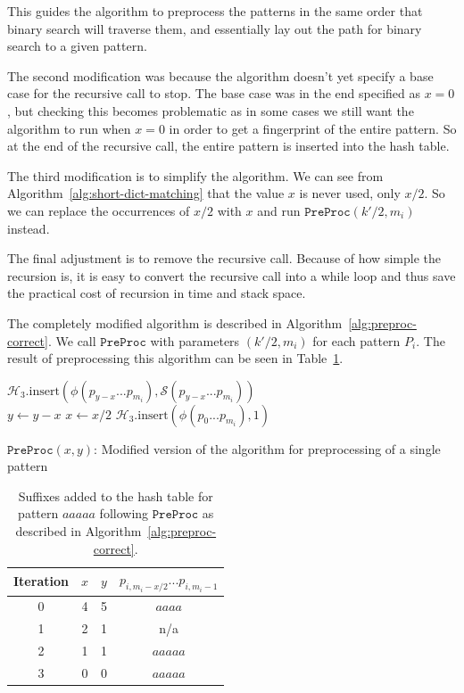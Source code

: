 \documentclass[ %
                    author={Dominic Joseph Moylett},
                    degree={MEng},
                     title={Dictionary Matching with Fingerprints},
                  subtitle={An Empirical Analysis},
                      type={Research},
                      year={2014} ]{dissertation}
\begin{document}
This guides the algorithm to preprocess the patterns in the same order that binary search will traverse them, and essentially lay out the path for binary search to a given pattern.

The second modification was because the algorithm doesn't yet specify a base case for the recursive call to stop. The base case was in the end specified as $x = 0$, but checking this becomes problematic as in some cases we still want the algorithm to run when $x = 0$ in order to get a fingerprint of the entire pattern. So at the end of the recursive call, the entire pattern is inserted into the hash table.

The third modification is to simplify the algorithm. We can see from Algorithm~\ref{alg:short-dict-matching} that the value $x$ is never used, only $x/2$. So we can replace the occurrences of $x/2$ with $x$ and run $\texttt{PreProc}(k'/2, m_i)$ instead.

The final adjustment is to remove the recursive call. Because of how simple the recursion is, it is easy to convert the recursive call into a while loop and thus save the practical cost of recursion in time and stack space.

The completely modified algorithm is described in Algorithm~\ref{alg:preproc-correct}. We call $\texttt{PreProc}$ with parameters $(k'/2, m_i)$ for each pattern $P_i$. The result of preprocessing this algorithm can be seen in Table~\ref{tab:preproc-results-correct}.

\begin{algorithm}[t]
 {
   {
    $\mathcal{H}_3.\text{insert}(\phi(p_{y-x}...p_{m_i}), \mathcal{S}(p_{y-x}...p_{m_i}))$\\
    $y \gets y - x$
  }
  $x \gets x/2$
}
$\mathcal{H}_3.\text{insert}(\phi(p_0...p_{m_i}), 1)$
\caption{$\mathtt{PreProc}(x,y)$: Modified version of the algorithm for preprocessing of a single pattern}
\label{alg:preproc-correct}
\end{algorithm}

\begin{table}[t]
  \centering
  \begin{tabular}{|c|c|c|c|}
    \hline
    Iteration & $x$ & $y$ & $p_{i, m_i-x/2}...p_{i, m_i - 1}$ \\\hline
    0 & 4 & 5 & $aaaa$ \\\hline
    1 & 2 & 1 & n/a \\\hline
    2 & 1 & 1 & $aaaaa$ \\\hline
    3 & 0 & 0 & $aaaaa$ \\\hline
  \end{tabular}
  \caption{Suffixes added to the hash table for pattern $aaaaa$ following $\texttt{PreProc}$ as described in Algorithm~\ref{alg:preproc-correct}.}
  \label{tab:preproc-results-correct}
\end{table}
\end{document}
